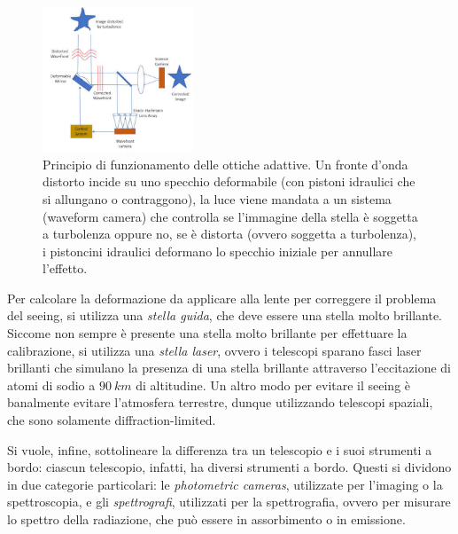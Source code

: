 \begin{figure}
\centering
\includegraphics[width=0.4\textwidth]{immagini/ottiche-adattive.jpg}
\caption{Principio di funzionamento delle ottiche adattive. Un fronte d’onda distorto incide su uno specchio deformabile (con pistoni idraulici che si allungano o contraggono), la luce viene mandata a un sistema (waveform camera) che controlla se l’immagine della stella è soggetta a turbolenza oppure no, se è distorta (ovvero soggetta a turbolenza), i pistoncini idraulici deformano lo specchio iniziale per annullare l'effetto.}
\label{fig:ottiche-adattive}
\end{figure}

Per calcolare la deformazione da applicare alla lente per correggere il problema del seeing, si utilizza una \emph{stella guida}, che deve essere una stella molto brillante. Siccome non sempre è presente una stella molto brillante per effettuare la calibrazione, si utilizza una \emph{stella laser}, ovvero i telescopi sparano fasci laser brillanti che simulano la presenza di una stella brillante attraverso l'eccitazione di atomi di sodio a $\SI{90}{km}$ di altitudine. Un altro modo per evitare il seeing è banalmente evitare l'atmosfera terrestre, dunque utilizzando telescopi spaziali, che sono solamente diffraction-limited.

Si vuole, infine, sottolineare la differenza tra un telescopio e i suoi strumenti a bordo: ciascun telescopio, infatti, ha diversi strumenti a bordo. Questi si dividono in due categorie particolari: le \emph{photometric cameras}, utilizzate per l'imaging o la spettroscopia, e gli \emph{spettrografi}, utilizzati per la spettrografia, ovvero per misurare lo spettro della radiazione, che può essere in assorbimento o in emissione.